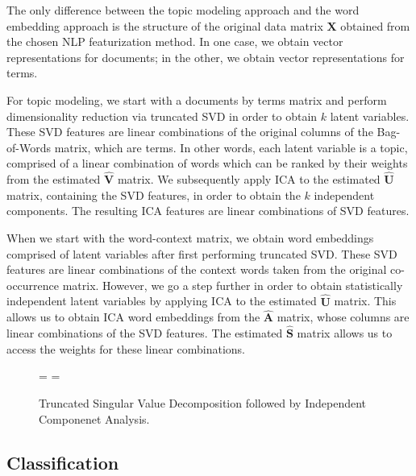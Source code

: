 \documentclass{article}
\begin{document}
The only difference between the topic modeling approach and the word
embedding approach is the structure of the original data matrix
\(\mathbf{X}\) obtained from the chosen NLP featurization method. In one
case, we obtain vector representations for documents; in the other, we
obtain vector representations for terms.

For topic modeling, we start with a documents by terms matrix and
perform dimensionality reduction via truncated SVD in order to obtain
\(k\) latent variables. These SVD features are linear combinations of
the original columns of the Bag-of-Words matrix, which are terms. In
other words, each latent variable is a topic, comprised of a linear
combination of words which can be ranked by their weights from the
estimated \(\mathbf{\hat{V}}\) matrix. We subsequently apply ICA to the
estimated \(\mathbf{\hat{U}}\) matrix, containing the SVD features, in
order to obtain the \(k\) independent components. The resulting ICA
features are linear combinations of SVD features.

When we start with the word-context matrix, we obtain word embeddings
comprised of latent variables after first performing truncated SVD.
These SVD features are linear combinations of the context words taken
from the original co-occurrence matrix. However, we go a step further in
order to obtain statistically independent latent variables by applying
ICA to the estimated \(\mathbf{\hat{U}}\) matrix. This allows us to
obtain ICA word embeddings from the \(\mathbf{\hat{A}}\) matrix, whose
columns are linear combinations of the SVD features. The estimated
\(\mathbf{\hat{S}}\) matrix allows us to access the weights for these
linear combinations.

\begin{figure}
  \centering
   = 
   
  \newline
  \newline
  \newline
   = 
   
  \caption{Truncated Singular Value Decomposition followed by Independent Componenet Analysis.}
  \label{fig:matdec}
\end{figure}

\hypertarget{classification}{%
\subsection{Classification}\label{classification}}
\end{document}
